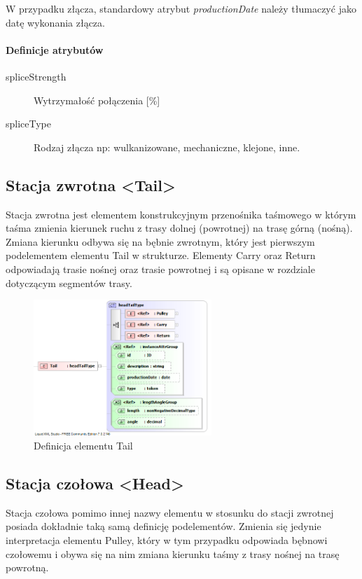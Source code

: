 \documentclass[12pt,a4paper]{article}
\begin{document}
W przypadku złącza, standardowy atrybut \emph{productionDate} należy tłumaczyć
jako datę wykonania złącza.

\paragraph{Definicje atrybutów}
\begin{description}
\item[spliceStrength] Wytrzymałość połączenia [\%]
\item[spliceType] Rodzaj złącza np: wulkanizowane, mechaniczne, klejone, inne.
\end{description}


\subsection{Stacja zwrotna <Tail>}
Stacja zwrotna jest elementem konstrukcyjnym przenośnika taśmowego w którym
taśma zmienia kierunek ruchu z trasy dolnej (powrotnej) na trasę górną (nośną).
Zmiana kierunku odbywa się na bębnie zwrotnym, który jest pierwszym podelementem
elementu Tail w strukturze.  Elementy Carry oraz Return odpowiadają trasie
nośnej oraz trasie powrotnej i są opisane w rozdziale dotyczącym segmentów
trasy.

\begin{figure}[h]
  \centering
  \includegraphics[width=0.6\textwidth]{png/liquid/Tail}
  \caption{Definicja elementu Tail}
  \label{fig:tail-xsd}
\end{figure}


\subsection{Stacja czołowa <Head>}
Stacja czołowa pomimo innej nazwy elementu w stosunku do stacji zwrotnej posiada
dokładnie taką samą definicję podelementów.  Zmienia się jedynie interpretacja
elementu Pulley, który w tym przypadku odpowiada bębnowi czołowemu i obywa się
na nim zmiana kierunku taśmy z trasy nośnej na trasę powrotną.
\end{document}

